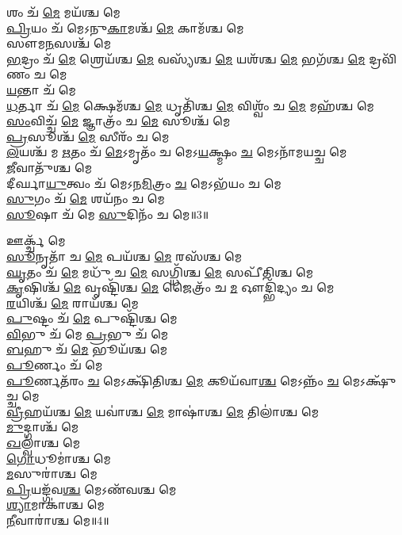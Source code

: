 𑌶𑌂 𑌚᳴ \ul{𑌮𑍇} 𑌮𑌯᳴𑌶𑍍𑌚 𑌮𑍇\\
\-\ul{𑌪𑍍𑌰𑌿}\-𑌯𑌂 𑌚᳴ 𑌮𑍇𑌽𑌨𑍁\-\ul{𑌕𑌾}\-𑌮𑌶𑍍𑌚᳴ \ul{𑌮𑍇} 𑌕𑌾𑌮᳴𑌶𑍍𑌚 𑌮𑍇\\
𑌸𑍗𑌮\-\ul{𑌨}\-𑌸𑌶𑍍𑌚᳴ 𑌮𑍇\\
\-\ul{𑌭}\-𑌦𑍍𑌰𑌂 𑌚᳴ \ul{𑌮𑍇} 𑌶𑍍𑌰𑍇𑌯᳴𑌶𑍍𑌚 \ul{𑌮𑍇} 𑌵𑌸𑍍𑌯᳴𑌶𑍍𑌚 \ul{𑌮𑍇} 𑌯𑌶᳴𑌶𑍍𑌚 \ul{𑌮𑍇} 𑌭𑌗᳴𑌶𑍍𑌚 \ul{𑌮𑍇} 𑌦𑍍𑌰𑌵𑌿᳴𑌣𑌂 𑌚 𑌮𑍇\\
\-\ul{𑌯}\-𑌨𑍍𑌤𑌾 𑌚᳴ 𑌮𑍇\\
\-\ul{𑌧}\-𑌰𑍍𑌤𑌾 𑌚᳴ \ul{𑌮𑍇} 𑌕𑍍𑌷𑍇𑌮᳴𑌶𑍍𑌚 \ul{𑌮𑍇} 𑌧𑍃𑌤𑌿᳴𑌶𑍍𑌚 \ul{𑌮𑍇} 𑌵𑌿𑌶𑍍𑌵𑌂᳴ 𑌚 \ul{𑌮𑍇} 𑌮𑌹᳴𑌶𑍍𑌚 𑌮𑍇\\
\-\ul{𑌸𑌂}\-𑌵𑌿𑌚𑍍𑌚᳴ \ul{𑌮𑍇} 𑌜𑍍𑌞𑌾𑌤𑍍𑌰𑌂᳴ 𑌚 \ul{𑌮𑍇} 𑌸𑍂𑌶𑍍𑌚᳴ 𑌮𑍇\\
\-\ul{𑌪𑍍𑌰}\-𑌸𑍂𑌶𑍍𑌚᳴ \ul{𑌮𑍇} 𑌸𑍀𑌰𑌂᳴ 𑌚 𑌮𑍇\\
\-\ul{𑌲}\-𑌯𑌶𑍍𑌚᳴ 𑌮 \ul{𑌋}\-𑌤𑌂 𑌚᳴ \ul{𑌮𑍇}\-𑌽𑌮𑍃𑌤𑌂᳴ 𑌚 𑌮𑍇𑌽\-\ul{𑌯}\-𑌕𑍍𑌷𑍍𑌮𑌂 \ul{𑌚} 𑌮𑍇𑌽𑌨𑌾᳴𑌮𑌯𑌚𑍍𑌚 𑌮𑍇\\
\-\ul{𑌜𑍀}\-𑌵𑌾𑌤𑍁᳴𑌶𑍍𑌚 𑌮𑍇\\
𑌦𑍀𑌰𑍍𑌘𑌾\-\ul{𑌯𑍁}\-𑌤𑍍𑌵𑌂 𑌚᳴ 𑌮𑍇𑌽𑌨\-\ul{𑌮𑌿}\-𑌤𑍍𑌰𑌂 \ul{𑌚} 𑌮𑍇𑌽𑌭᳴𑌯𑌂 𑌚 𑌮𑍇\\
\-\ul{𑌸𑍁}\-𑌗𑌂 𑌚᳴ \ul{𑌮𑍇} 𑌶𑌯᳴𑌨𑌂 𑌚 𑌮𑍇\\
\-\ul{𑌸𑍂}\-𑌷𑌾 𑌚᳴ 𑌮𑍇 \ul{𑌸𑍁}\-𑌦𑌿𑌨𑌂᳴ 𑌚 𑌮𑍇॥3॥ 

𑌊𑌰𑍍𑌕𑍍𑌚᳴ 𑌮𑍇\\
\-\ul{𑌸𑍂}\-𑌨𑍃𑌤𑌾᳴ 𑌚 \ul{𑌮𑍇} 𑌪𑌯᳴𑌶𑍍𑌚 \ul{𑌮𑍇} 𑌰𑌸᳴𑌶𑍍𑌚 𑌮𑍇\\
\-\ul{𑌘𑍃}\-𑌤𑌂 𑌚᳴ \ul{𑌮𑍇} 𑌮𑌧𑍁᳴ 𑌚 \ul{𑌮𑍇} 𑌸𑌗𑍍𑌧𑌿᳴𑌶𑍍𑌚 \ul{𑌮𑍇} 𑌸𑌪𑍀᳴𑌤𑌿𑌶𑍍𑌚 𑌮𑍇\\
\-\ul{𑌕𑍃}\-𑌷𑌿𑌶𑍍𑌚᳴ \ul{𑌮𑍇} 𑌵𑍃𑌷𑍍𑌟𑌿᳴𑌶𑍍𑌚 \ul{𑌮𑍇} 𑌜𑍈𑌤𑍍𑌰𑌂᳴ 𑌚 \ul{𑌮} 𑌔𑌦𑍍𑌭𑌿᳴𑌦𑍍𑌯𑌂 𑌚 𑌮𑍇\\
\-\ul{𑌰}\-𑌯𑌿𑌶𑍍𑌚᳴ \ul{𑌮𑍇} 𑌰𑌾𑌯᳴𑌶𑍍𑌚 𑌮𑍇\\
\-\ul{𑌪𑍁}\-𑌷𑍍𑌟𑌂 𑌚᳴ \ul{𑌮𑍇} 𑌪𑍁𑌷𑍍𑌟𑌿᳴𑌶𑍍𑌚 𑌮𑍇\\
\-\ul{𑌵𑌿}\-𑌭𑍁 𑌚᳴ 𑌮𑍇 \ul{𑌪𑍍𑌰}\-𑌭𑍁 𑌚᳴ 𑌮𑍇\\
\-\ul{𑌬}\-𑌹𑍁 𑌚᳴ \ul{𑌮𑍇} 𑌭𑍂𑌯᳴𑌶𑍍𑌚 𑌮𑍇\\
\-\ul{𑌪𑍂}\-𑌰𑍍𑌣𑌂 𑌚᳴ 𑌮𑍇\\
\-\ul{𑌪𑍂}\-𑌰𑍍𑌣𑌤᳴𑌰𑌂 \ul{𑌚} 𑌮𑍇𑌽𑌕𑍍𑌷𑌿᳴𑌤𑌿𑌶𑍍𑌚 \ul{𑌮𑍇} 𑌕𑍂𑌯᳴𑌵𑌾\-\ul{𑌶𑍍𑌚} 𑌮𑍇𑌽𑌨𑍍𑌨𑌂᳴ \ul{𑌚} 𑌮𑍇𑌽𑌕𑍍𑌷𑍁᳴𑌚𑍍𑌚 𑌮𑍇\\
\-\ul{𑌵𑍍𑌰𑍀}\-𑌹𑌯᳴𑌶𑍍𑌚 \ul{𑌮𑍇} 𑌯𑌵𑌾॑𑌶𑍍𑌚 \ul{𑌮𑍇} 𑌮𑌾𑌷𑌾॑𑌶𑍍𑌚 \ul{𑌮𑍇} 𑌤𑌿𑌲𑌾॑𑌶𑍍𑌚 𑌮𑍇\\
\-\ul{𑌮𑍁}\-𑌦𑍍𑌗𑌾𑌶𑍍𑌚᳴ 𑌮𑍇\\
\-\ul{𑌖}\-𑌲𑍍𑌵𑌾॑𑌶𑍍𑌚 𑌮𑍇\\
\-\ul{𑌗𑍋}\-𑌧𑍂𑌮𑌾॑𑌶𑍍𑌚 𑌮𑍇\\
\-\ul{𑌮}\-𑌸𑍁𑌰𑌾॑𑌶𑍍𑌚 𑌮𑍇\\
\-\ul{𑌪𑍍𑌰𑌿}\-𑌯𑌙𑍍𑌗᳴𑌵\-\ul{𑌶𑍍𑌚} 𑌮𑍇𑌽𑌣᳴𑌵𑌶𑍍𑌚 𑌮𑍇\\
\-\ul{𑌶𑍍𑌯𑌾}\-𑌮𑌾𑌕𑌾॑𑌶𑍍𑌚 𑌮𑍇\\
\-\ul{𑌨𑍀}\-𑌵𑌾𑌰𑌾॑𑌶𑍍𑌚 𑌮𑍇॥4॥ 

